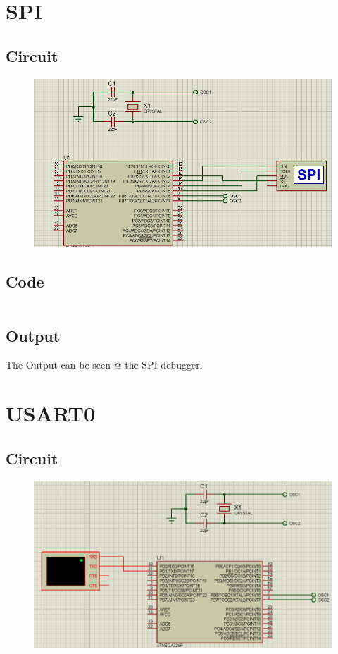 \documentclass[oneside]{book}
\begin{document}
\section{SPI}
\subsection{Circuit}
\begin{figure}[H]
    \centering
    \includegraphics[height=0.2\textheight]{SPI.png}
\end{figure}
\subsection{Code}
\inputminted[bgcolor=black]{c}{../programFiles/SPI.c}
\subsection{Output}
\quad The Output can be seen @ the SPI debugger.


\section{USART0}
\subsection{Circuit}
\begin{figure}[H]
    \centering
    \includegraphics[height=0.2\textheight]{USART0.png}
\end{figure}
\end{document}
